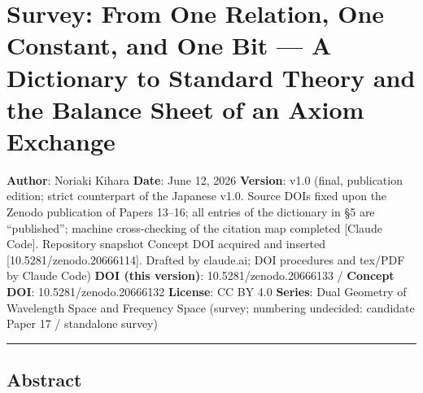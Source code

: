 \documentclass[
]{article}
\author{}
\date{}
\begin{document}
\section{Survey: From One Relation, One Constant, and One Bit --- A
Dictionary to Standard Theory and the Balance Sheet of an Axiom
Exchange}\label{survey-from-one-relation-one-constant-and-one-bit-a-dictionary-to-standard-theory-and-the-balance-sheet-of-an-axiom-exchange}

\textbf{Author}: Noriaki Kihara \textbf{Date}: June 12, 2026
\textbf{Version}: v1.0 (final, publication edition; strict counterpart
of the Japanese v1.0. Source DOIs fixed upon the Zenodo publication of
Papers 13--16; all entries of the dictionary in §5 are ``published'';
machine cross-checking of the citation map completed {[}Claude Code{]}.
Repository snapshot Concept DOI acquired and inserted
{[}10.5281/zenodo.20666114{]}. Drafted by claude.ai; DOI procedures and
tex/PDF by Claude Code) \textbf{DOI (this version)}:
10.5281/zenodo.20666133 / \textbf{Concept DOI}: 10.5281/zenodo.20666132
\textbf{License}: CC BY 4.0 \textbf{Series}: Dual Geometry of Wavelength
Space and Frequency Space (survey; numbering undecided: candidate Paper
17 / standalone survey)

\begin{center}\rule{0.5\linewidth}{0.5pt}\end{center}

\subsection{Abstract}\label{abstract}
\end{document}
